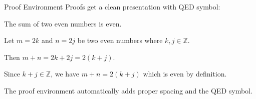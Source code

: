 \documentclass[aspectratio=169]{beamer}
\begin{document}
\begin{frame}{Proof Environment}
  Proofs get a clean presentation with QED symbol:

  \vspace{0.5em}

  \begin{shibuitheorem}
    The sum of two even numbers is even.
  \end{shibuitheorem}

  \begin{shibuiproof}
    Let $m = 2k$ and $n = 2j$ be two even numbers where $k, j \in \mathbb{Z}$.

    Then $m + n = 2k + 2j = 2(k + j)$.

    Since $k + j \in \mathbb{Z}$, we have $m + n = 2(k + j)$ which is even by definition.
  \end{shibuiproof}

  \vspace{0.3em}

  The proof environment automatically adds proper spacing and the QED symbol.
\end{frame}
\end{document}
